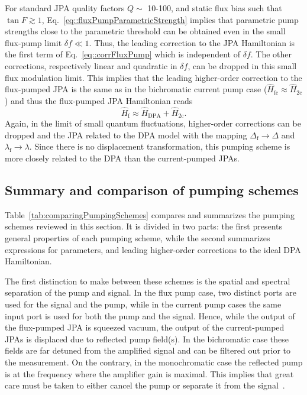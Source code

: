 \documentclass[pra,twocolumn,superscriptaddress]{revtex4-1}
\newcommand{\corrDoublePump}[0]{\hat{H}_{\mathrm{2c}}}
\newcommand{\lfp}[0]{\lambda_{\mathrm{f}}}
\newcommand{\Dfp}[0]{\Delta_{\mathrm{f}}}
\newcommand{\corrFluxPump}[0]{\hat{H}_{\mathrm{fc}}}
\newcommand{\df}[0]{\delta\!f}
\begin{document}
For standard JPA quality factors  $Q \sim$ 10-100, and static flux bias such that $\tan F \gtrsim 1$, Eq.~\eqref{eq::fluxPumpParametricStrength} implies that parametric pump strengths close to the parametric threshold can be obtained even in the small flux-pump limit $\df \ll 1$. 
Thus, the leading correction to the JPA Hamiltonian is the first term of Eq.~\eqref{eq::corrFluxPump} which is independent of $\df$. The other corrections, respectively linear and quadratic in $\df$, can be dropped in this small flux modulation limit. This implies that the leading higher-order correction to the flux-pumped JPA is the same as in the bichromatic current pump case ($\corrFluxPump \approx \corrDoublePump$) and thus the flux-pumped JPA Hamiltonian reads
\begin{equation}
	\hat H_{\mathrm{f}} \approx \hat H_{\mathrm{DPA}} + \corrDoublePump.
	\label{eq:ApproxHfluxPump}
\end{equation}
% 
Again, in the limit of small quantum fluctuations, higher-order corrections can be dropped and the JPA related to the DPA model with the mapping $\Dfp\rightarrow \Delta$ and $\lfp\rightarrow \lambda$. 
Since there is no displacement transformation, this pumping scheme is more closely related to the DPA than the current-pumped JPAs. 

\subsection{Summary and comparison of pumping schemes}
\label{subsec::pumpSummary}
% 
Table~\ref{tab:comparingPumpingSchemes} compares and  summarizes the pumping schemes reviewed in this section. It is divided in two parts:  the first presents general properties of each pumping scheme, while the second summarizes expressions for parameters, and leading higher-order corrections to the ideal DPA Hamiltonian.  
 

The first distinction to make between these schemes is the spatial and spectral separation of the pump and signal. 
In the flux pump case, two distinct ports are used for the signal and the pump, 
while in the current pump cases the same input port is used for both the pump and the signal. Hence, while the output of the flux-pumped JPA is squeezed vacuum, the output of the current-pumped JPAs is displaced due to reflected pump field(s). 
% 
In the bichromatic case these fields are far detuned from the amplified signal and can be filtered out prior to the measurement. On the contrary, in the monochromatic case the reflected pump is at the frequency where the amplifier gain is maximal. 
% 
This implies that great care must be taken to either cancel the pump or separate it from the signal~\cite{Eichler:2013kx}.
\end{document}
